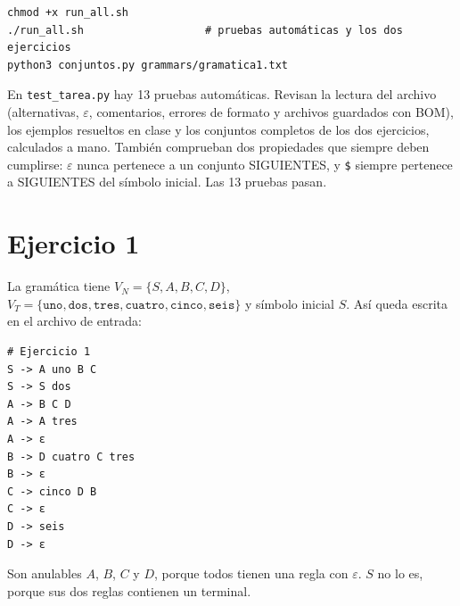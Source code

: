 \documentclass[12pt,letterpaper]{article}
\newcommand{\tk}[1]{\texttt{#1}}
\begin{document}
\noindent\begin{minipage}{\linewidth}
\begin{lstlisting}[caption={Comandos ejecutados en Ubuntu.}]
chmod +x run_all.sh
./run_all.sh                   # pruebas automáticas y los dos ejercicios
python3 conjuntos.py grammars/gramatica1.txt
\end{lstlisting}
\end{minipage}

En \tk{test\_tarea.py} hay 13 pruebas automáticas. Revisan la lectura del archivo (alternativas, $\varepsilon$, comentarios, errores de formato y archivos guardados con BOM), los ejemplos resueltos en clase y los conjuntos completos de los dos ejercicios, calculados a mano. También comprueban dos propiedades que siempre deben cumplirse: $\varepsilon$ nunca pertenece a un conjunto SIGUIENTES, y \tk{\$} siempre pertenece a SIGUIENTES del símbolo inicial. Las 13 pruebas pasan.

\section{Ejercicio 1}

La gramática tiene $V_N = \{S, A, B, C, D\}$, $V_T = \{\tk{uno},\allowbreak \tk{dos},\allowbreak \tk{tres},\allowbreak \tk{cuatro},\allowbreak \tk{cinco},\allowbreak \tk{seis}\}$ y símbolo inicial $S$. Así queda escrita en el archivo de entrada:

\noindent\begin{minipage}{\linewidth}
\begin{lstlisting}[caption={\texttt{grammars/gramatica1.txt}.}]
# Ejercicio 1
S -> A uno B C
S -> S dos
A -> B C D
A -> A tres
A -> ε
B -> D cuatro C tres
B -> ε
C -> cinco D B
C -> ε
D -> seis
D -> ε
\end{lstlisting}
\end{minipage}

Son anulables $A$, $B$, $C$ y $D$, porque todos tienen una regla con $\varepsilon$. $S$ no lo es, porque sus dos reglas contienen un terminal.
\end{document}
